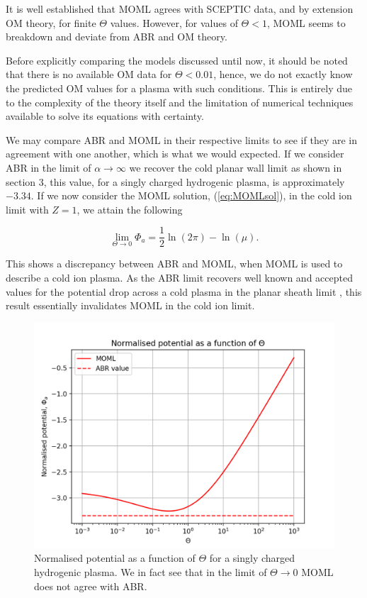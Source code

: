 \documentclass{article}
\begin{document}
\smallskip

It is well established that MOML agrees with SCEPTIC data, and by extension OM theory,
for finite $\Theta$ values. However, for values of $\Theta < 1$, MOML seems to breakdown and deviate 
from ABR and OM theory. 

\smallskip

Before explicitly comparing the models discussed until now, it should be noted that 
there is no available OM data for $\Theta < 0.01$, hence, we do not exactly know the predicted OM
values for a plasma with such conditions. This is entirely due to the complexity
of the theory itself and the limitation of numerical techniques available to solve its equations
with certainty. 

\smallskip

We may compare ABR and MOML in their respective limits to see if they are in 
agreement with one another, which is what we would expected.
If we consider ABR in the limit of $\alpha \to \infty$ we recover the cold planar
wall limit as shown in section 3, this value, for a singly charged hydrogenic plasma, is approximately $-3.34$. If we now consider
the MOML solution, (\ref{eq:MOMLsol}), in the cold ion limit with $Z = 1$, we attain the following

\begin{equation}\label{eq:OMLLim}
\lim_{\Theta \to 0} \Phi_{a} = \frac{1}{2}\ln{\left(2 \pi \right)} - \ln{\left(\mu \right)}.
\end{equation}

\smallskip

This shows a discrepancy between ABR and MOML, when MOML is used to
describe a cold ion plasma. As the ABR limit recovers well known and accepted values for
the potential drop across a cold plasma in the planar sheath limit \cite{Stangeby1986} \cite{Stangeby2000}, this result essentially
invalidates MOML in the cold ion limit.
    
\begin{figure}[H]
\centering
\includegraphics[width=\linewidth]{Output/MOMLvsABR.jpeg}
\caption{Normalised potential as a function of $\Theta$ for a singly charged hydrogenic plasma.
We in fact see that in the limit of $\Theta \to 0$ MOML does not agree with ABR.}
\label{MOMLvsABR} 
\end{figure}
\end{document}
